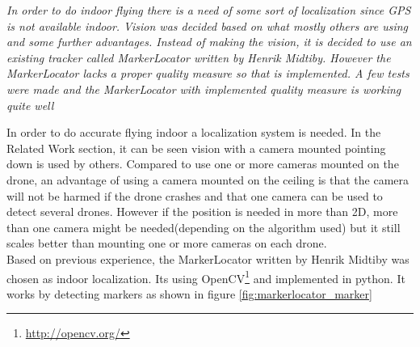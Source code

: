 \textit{In order to do indoor flying there is a need of some sort of localization since GPS is not available indoor. Vision was decided based on what mostly others are using and some further advantages. Instead of making the vision, it is decided to use an existing tracker called MarkerLocator written by Henrik Midtiby. However the MarkerLocator lacks a proper quality measure so that is implemented. A few tests were made and the MarkerLocator with implemented quality measure is working quite well}


In order to do accurate flying indoor a localization system is needed. In the Related Work section, it can be seen vision with a camera mounted pointing down is used by others. Compared to use one or more cameras mounted on the drone, an advantage of using a camera mounted on the ceiling is that the camera will not be harmed if the drone crashes and that one camera can be used to detect several drones. However if the position is needed in more than 2D, more than one camera might be needed(depending on the algorithm used) but it still scales better than mounting one or more cameras on each drone. \\

Based on previous experience, the MarkerLocator written by Henrik Midtiby was chosen as indoor localization. Its using OpenCV\footnote{\url{http://opencv.org/}} and implemented in python. It works by detecting markers as shown in figure \ref{fig:markerlocator_marker}


